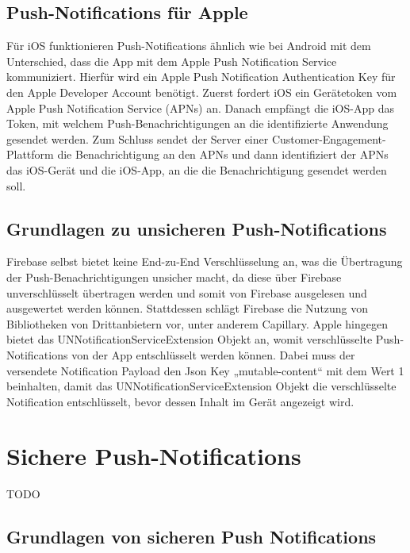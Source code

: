 \documentclass[sigconf]{acmart}
\begin{document}
\subsection{Push-Notifications für Apple}

Für iOS funktionieren Push-Notifications ähnlich wie bei Android 
mit dem Unterschied, dass die App mit dem Apple Push Notification 
Service kommuniziert. Hierfür wird ein Apple Push Notification 
Authentication Key für den Apple Developer Account benötigt. 
Zuerst fordert iOS ein Gerätetoken vom Apple Push Notification 
Service (APNs) an. Danach empfängt die iOS-App das Token, mit 
welchem Push-Benachrichtigungen an die identifizierte Anwendung 
gesendet werden. Zum Schluss sendet der Server einer 
Customer-Engagement-Plattform die Benachrichtigung an den APNs 
und dann identifiziert der APNs das iOS-Gerät und die iOS-App, 
an die die Benachrichtigung gesendet werden soll.\cite{apple}

\subsection{Grundlagen zu unsicheren Push-Notifications}

Firebase selbst bietet keine End-zu-End Verschlüsselung an, was 
die Übertragung der Push-Benachrichtigungen unsicher macht, da 
diese über Firebase unverschlüsselt übertragen werden und somit 
von Firebase ausgelesen und ausgewertet werden können. Stattdessen 
schlägt Firebase die Nutzung von Bibliotheken von Drittanbietern vor, 
unter anderem Capillary.\cite{firebase2}
Apple hingegen bietet das UNNotificationServiceExtension Objekt an, 
womit verschlüsselte Push-Notifications von der App entschlüsselt 
werden können. Dabei muss der versendete Notification Payload den 
Json Key „mutable-content“ mit dem Wert 1 beinhalten, damit das 
UNNotificationServiceExtension Objekt die verschlüsselte Notification 
entschlüsselt, bevor dessen Inhalt im Gerät angezeigt wird.\cite{apple1}\cite{apple2}

\section{Sichere Push-Notifications}

TODO

\subsection{Grundlagen von sicheren Push Notifications}
\end{document}

